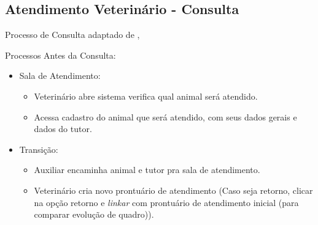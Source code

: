 \documentclass[
    12pt,               %
    openright,          %
    oneside,
    a4paper,            %
    BIBLATEX,           %
    TODO,               %
    english,            %
    brazil              %
    ]{ifsp-spo-inf-ctds}
\begin{document}
    \subsection{ Atendimento Veterinário - Consulta}
    Processo de Consulta adaptado de ,     

    
    Processos Antes da Consulta:

	\begin{itemize}
	    \item Sala de Atendimento:
            \begin{itemize}
                \item Veterinário abre sistema verifica qual animal será atendido.
                \item Acessa cadastro do animal que será atendido, com seus dados gerais e dados do tutor.
            \end{itemize}
	\end{itemize}

		
    \begin{itemize}
        \item Transição:
            \begin{itemize}
                \item Auxiliar encaminha animal e tutor pra sala de atendimento.
                \item Veterinário cria novo prontuário de atendimento (Caso seja retorno, clicar na opção retorno e \emph{linkar} com prontuário de atendimento inicial (para comparar evolução de quadro)).
            \end{itemize}
    \end{itemize}
\end{document}
